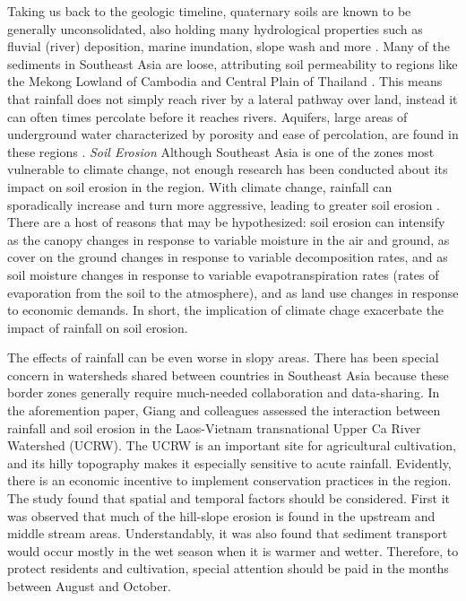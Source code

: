 Taking us back to the geologic timeline, quaternary soils are known to be generally unconsolidated, also holding many hydrological properties such as fluvial (river) deposition, marine inundation, slope wash and more \citep{chappell2007runoff}. Many of the sediments in Southeast Asia are loose, attributing soil permeability to regions like the Mekong Lowland of Cambodia and Central Plain of Thailand \citep{chiem1993geo}. This means that rainfall does not simply reach river by a lateral pathway over land, instead it can often times percolate before it reaches rivers. Aquifers, large areas of underground water characterized by porosity and ease of percolation, are found in these regions \citep{struckmeier2004groundwater}. \newline
\textit{Soil Erosion} \newline
Although Southeast Asia is one of the zones most vulnerable to climate change, not enough research has been conducted about its impact on soil erosion in the region. With climate change, rainfall can sporadically increase and turn more aggressive, leading to greater soil erosion \citep{chappell2007runoff}. There are a host of reasons that may be hypothesized: soil erosion can intensify as the canopy changes in response to variable moisture in the air and ground, as cover on the ground changes in response to variable decomposition rates, and as soil moisture changes in response to variable evapotranspiration rates (rates of evaporation from the soil to the atmosphere), and as land use changes in response to economic demands. In short, the implication of climate chage exacerbate the impact of rainfall on soil erosion. 

The effects of rainfall can be even worse in slopy areas. There has been special concern in watersheds shared between countries in Southeast Asia because these border zones generally require much-needed collaboration and data-sharing.\citep{giang2017spatial} In the aforemention paper, Giang and colleagues assessed the interaction between rainfall and soil erosion in the Laos-Vietnam transnational Upper Ca River Watershed (UCRW). The UCRW is an important site for agricultural cultivation, and its hilly topography makes it especially sensitive to acute rainfall. Evidently, there is an economic incentive to implement conservation practices in the region. The study found that spatial and temporal factors should be considered. First it was observed that much of the hill-slope erosion is found in the upstream and middle stream areas. Understandably, it was also found that sediment transport would occur mostly in the wet season when it is warmer and wetter. Therefore, to protect residents and cultivation, special attention should be paid in the months between August and October. 

